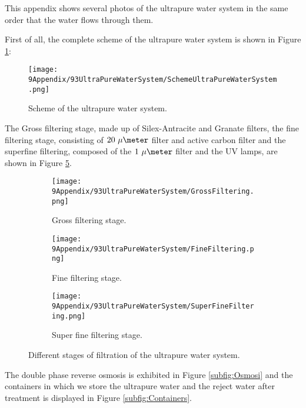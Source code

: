 This appendix shows several photos of the ultrapure water system in the same order that the water flows through them.

First of all, the complete scheme of the ultrapure water system is shown in Figure \ref{fig:SchemeUPWS}:

\begin{figure}[htbp]
\centering
\texttt{[image: 9Appendix/93UltraPureWaterSystem/SchemeUltraPureWaterSystem.png]}
\caption{Scheme of the ultrapure water system.\label{fig:SchemeUPWS}}
\end{figure}

The Gross filtering stage, made up of Silex-Antracite and Granate filters, the fine filtering stage, consisting of $20~\mu\meter$ filter and active carbon filter and the superfine filtering, composed of the $1~\mu\meter$ filter and the UV lamps, are shown in Figure \ref{fig:UltraPureWaterStages}.

\begin{figure}
\centering
    \begin{subfigure}[b]{0.3\textwidth}
    \centering
    \texttt{[image: 9Appendix/93UltraPureWaterSystem/GrossFiltering.png]}  
    \caption{Gross filtering stage.\label{subfig:GrossFiltering}}
    \end{subfigure}
    \hfill
    \begin{subfigure}[b]{0.3\textwidth}
    \centering
    \texttt{[image: 9Appendix/93UltraPureWaterSystem/FineFiltering.png]}  
    \caption{Fine filtering stage.\label{subfig:FineFiltering}}
    \end{subfigure}
    \hfill
    \begin{subfigure}[b]{0.3\textwidth}
    \centering
    \texttt{[image: 9Appendix/93UltraPureWaterSystem/SuperFineFiltering.png]}  
    \caption{Super fine filtering stage.\label{subfig:SuperFineFiltering}}
    \end{subfigure}
 \caption{Different stages of filtration of the ultrapure water system.}
 \label{fig:UltraPureWaterStages}
\end{figure}

The double phase reverse osmosis is exhibited in Figure \ref{subfig:Osmosi} and the containers in which we store the ultrapure water and the reject water after treatment is displayed in Figure \ref{subfig:Containers}.


